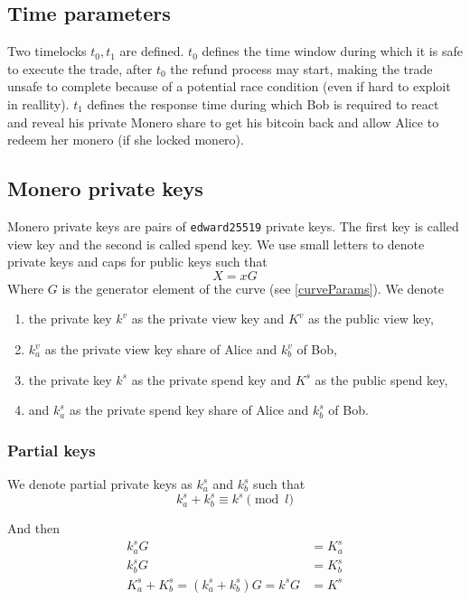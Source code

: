 \documentclass{llncs}
\begin{document}
\subsection{Time parameters}
Two timelocks $t_0, t_1$ are defined. $t_0$ defines the time window during which it is safe to execute the trade, after $t_0$ the refund process may start, making the trade unsafe to complete because of a potential race condition (even if hard to exploit in reallity). $t_1$ defines the response time during which Bob is required to react and reveal his private Monero share to get his bitcoin back and allow Alice to redeem her monero (if she locked monero).

\subsection{Monero private keys}
Monero private keys are pairs of \texttt{edward25519} private keys. The first key is called view key and the second is called spend key. We use small letters to denote private keys and caps for public keys such that
$$X = xG$$
Where $G$ is the generator element of the curve (see \ref{curveParams}). We denote
\begin{enumerate}[label=(\roman*)]
    \item the private key $k^v$ as the private view key and $K^v$ as the public view key,
    \item $k^v_a$ as the private view key share of Alice and $k^v_b$ of Bob,
    \item the private key $k^s$ as the private spend key and $K^s$ as the public spend key,
    \item and $k^s_a$ as the private spend key share of Alice and $k^s_b$ of Bob.
\end{enumerate}

\subsubsection{Partial keys}
We denote partial private keys as $k^s_a$ and $k^s_b$ such that
$$k^s_a + k^s_b \equiv k^s \pmod l$$

And then
\begin{equation}
\begin{split}
    k^s_aG &= K^s_a \\
    k^s_bG &= K^s_b \\
    K^s_a + K^s_b = (k^s_a + k^s_b)G = k^sG &= K^s
\end{split}
\end{equation}
\end{document}

